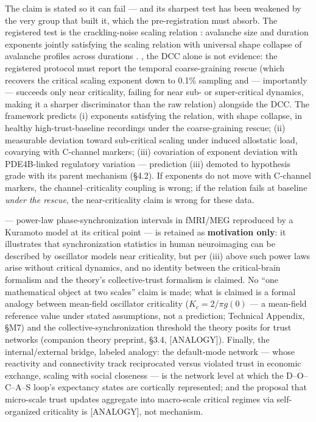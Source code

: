 \documentclass[
]{article}
\begin{document}
The claim is stated so it can fail --- and its sharpest test has been
weakened by the very group that built it, which the pre-registration
must absorb. The registered test is the crackling-noise scaling relation
: avalanche size and duration exponents jointly satisfying the scaling
relation with universal shape collapse of avalanche profiles across
durations . , the DCC alone is not evidence: the registered protocol
must report the temporal coarse-graining rescue (which recovers the
critical scaling exponent down to 0.1\% sampling and --- importantly ---
succeeds only near criticality, failing for near sub- or super-critical
dynamics, making it a sharper discriminator than the raw relation)
alongside the DCC. The framework predicts (i) exponents satisfying the
relation, with shape collapse, in healthy high-trust-baseline recordings
under the coarse-graining rescue; (ii) measurable deviation toward
sub-critical scaling under induced allostatic load, covarying with
C-channel markers; (iii) covariation of exponent deviation with
PDE4B-linked regulatory variation --- prediction (iii) demoted to
hypothesis grade with its parent mechanism (§4.2). If exponents do not
move with C-channel markers, the channel--criticality coupling is wrong;
if the relation fails at baseline \emph{under the rescue}, the
near-criticality claim is wrong for these data.

--- power-law phase-synchronization intervals in fMRI/MEG reproduced by
a Kuramoto model at its critical point --- is retained as
\textbf{motivation only}: it illustrates that synchronization statistics
in human neuroimaging can be described by oscillator models near
criticality, but per (iii) above such power laws arise without critical
dynamics, and no identity between the critical-brain formalism and the
theory's collective-trust formalism is claimed. No ``one mathematical
object at two scales'' claim is made; what is claimed is a formal
analogy between mean-field oscillator criticality (\(K_c = 2/\pi g(0)\)
--- a mean-field reference value under stated assumptions, not a
prediction; Technical Appendix, §M7) and the collective-synchronization
threshold the theory posits for trust networks (companion theory
preprint, §3.4, {[}ANALOGY{]}). Finally, the internal/external bridge,
labeled analogy: the default-mode network --- whose reactivity and
connectivity track reciprocated versus violated trust in economic
exchange, scaling with social closeness --- is the network level at
which the D--O--C--A--S loop's expectancy states are cortically
represented; and the proposal that micro-scale trust updates aggregate
into macro-scale critical regimes via self-organized criticality is
{[}ANALOGY{]}, not mechanism.
\end{document}
